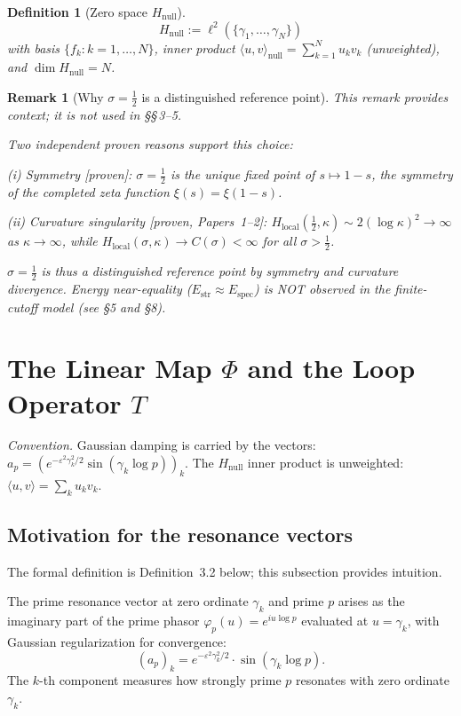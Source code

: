 \documentclass[11pt]{article}
\newtheorem{definition}[theorem]{Definition}
\newtheorem*{remark}{Remark}
\newcommand{\Hnull}{H_{\mathrm{null}}}
\newcommand{\Estr}{E_{\mathrm{str}}}
\newcommand{\Espec}{E_{\mathrm{spec}}}
\newcommand{\Hlocal}{H_{\mathrm{local}}}
\begin{document}
\begin{definition}[Zero space $\Hnull$]
\[
\Hnull := \ell^2(\{\gamma_1,\ldots,\gamma_N\})
\]
with basis $\{f_k:k=1,\ldots,N\}$, inner product
$\langle u,v\rangle_{\mathrm{null}}=\sum_{k=1}^N u_k v_k$
(unweighted), and $\dim\Hnull=N$.
\end{definition}

\begin{remark}[Why $\sigma=\tfrac12$ is a distinguished reference point]
\label{rem:half}
This remark provides context; it is not used in \S\S\,3--5.

Two independent proven reasons support this choice:

\emph{(i) Symmetry} [proven]: $\sigma=\tfrac12$ is the unique fixed point of
$s\mapsto 1-s$, the symmetry of the completed zeta function
$\xi(s)=\xi(1-s)$.

\emph{(ii) Curvature singularity} [proven, Papers~1--2]:
$\Hlocal(\tfrac12,\kappa)\sim 2(\log\kappa)^2\to\infty$ as $\kappa\to\infty$,
while $\Hlocal(\sigma,\kappa)\to C(\sigma)<\infty$ for all $\sigma>\tfrac12$.

$\sigma=\tfrac12$ is thus a distinguished reference point by symmetry and
curvature divergence. Energy near-equality ($\Estr\approx\Espec$) is NOT
observed in the finite-cutoff model (see \S5 and \S8).
\end{remark}

\section{The Linear Map $\Phi$ and the Loop Operator $T$}

\emph{Convention.} Gaussian damping is carried by the vectors:
$a_p=(e^{-\varepsilon^2\gamma_k^2/2}\sin(\gamma_k\log p))_k$.
The $\Hnull$ inner product is unweighted: $\langle u,v\rangle=\sum_k u_kv_k$.

\subsection{Motivation for the resonance vectors}

The formal definition is Definition~3.2 below; this subsection
provides intuition.

The prime resonance vector at zero ordinate $\gamma_k$ and prime $p$ arises as
the imaginary part of the prime phasor $\varphi_p(u)=e^{iu\log p}$ evaluated
at $u=\gamma_k$, with Gaussian regularization for convergence:
\[
(a_p)_k = e^{-\varepsilon^2\gamma_k^2/2}\cdot\sin(\gamma_k\log p).
\]
The $k$-th component measures how strongly prime $p$ resonates with zero
ordinate $\gamma_k$.
\end{document}
